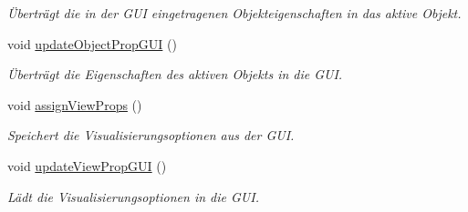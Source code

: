 \begin{DoxyCompactItemize}
\begin{DoxyCompactList}\small\item\em Überträgt die in der G\-U\-I eingetragenen Objekteigenschaften in das aktive Objekt. \end{DoxyCompactList}\item 
void \hyperlink{classGUIMainWindow_a4c520b8716196fa1e88a7bea5ec34ef0}{update\-Object\-Prop\-G\-U\-I} ()
\begin{DoxyCompactList}\small\item\em Überträgt die Eigenschaften des aktiven Objekts in die G\-U\-I. \end{DoxyCompactList}\item 
void \hyperlink{classGUIMainWindow_ab73ac039ffebd656aa3dc0eac2fcf74f}{assign\-View\-Props} ()
\begin{DoxyCompactList}\small\item\em Speichert die Visualisierungsoptionen aus der G\-U\-I. \end{DoxyCompactList}\item 
void \hyperlink{classGUIMainWindow_a2af54fc375be6b0fb938b8562980e723}{update\-View\-Prop\-G\-U\-I} ()
\begin{DoxyCompactList}\small\item\em Lädt die Visualisierungsoptionen in die G\-U\-I. \end{DoxyCompactList}\end{DoxyCompactItemize}
